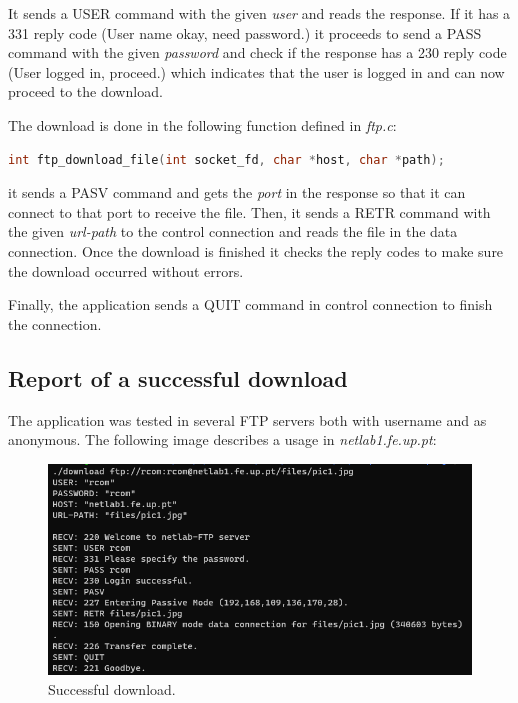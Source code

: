 \documentclass[a4paper,11pt,english]{article}
\begin{document}
        \noindent It sends a USER command with the given \textit{user} and reads the response. If it has
        a 331 reply code (User name okay, need password.) it proceeds to send a PASS command with the
        given \textit{password} and check if the response has a 230 reply code (User logged in, proceed.)
        which indicates that the user is logged in and can now proceed to the download.

        The download is done in the following function defined in \textit{ftp.c}:
\begin{lstlisting}[language=C]
int ftp_download_file(int socket_fd, char *host, char *path);
\end{lstlisting}

        \noindent it sends a PASV command and gets the \textit{port} in the response so that it can connect
        to that port to receive the file. Then, it sends a RETR command with the given \textit{url-path} to
        the control connection and reads the file in the data connection. Once the download is finished it checks
        the reply codes to make sure the download occurred without errors.

        \noindent Finally, the application sends a QUIT command in control connection to finish the connection.


    \subsection{Report of a successful download}
        The application was tested in several FTP servers both with username and as anonymous. The
        following image describes a usage in \textit{netlab1.fe.up.pt}:

        \begin{figure}[H]
            \centering
            \includegraphics[scale=0.4]{./imgs/download.png}
            \caption{Successful download.}
            \label{fig:download}
        \end{figure}
\end{document}

